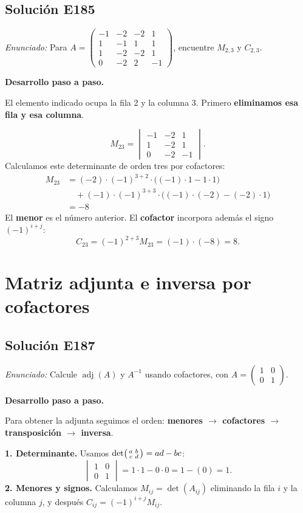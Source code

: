 \documentclass[12pt]{article}
\theoremstyle{remark}
\newcommand{\adj}{\operatorname{adj}}
\newcommand{\solucion}[2]{\Needspace{11\baselineskip}\subsection*{Solución E#1}\noindent\textit{Enunciado:} #2\par\medskip\noindent\textbf{Desarrollo paso a paso.}\par\medskip}
\begin{document}
\medskip

\solucion{185}{Para $A=\begin{pmatrix}-1&-2&-2&1\\1&-1&1&1\\1&-2&-2&1\\0&-2&2&-1\end{pmatrix}$, encuentre $M_{2,3}$ y $C_{2,3}$.}
El elemento indicado ocupa la fila 2 y la columna 3. Primero \textbf{eliminamos esa fila y esa columna}.

\[
M_{23}=\begin{vmatrix}-1&-2&1\\1&-2&1\\0&-2&-1\end{vmatrix}.
\]
Calculamos este determinante de orden tres por cofactores:
\[
\begin{aligned}M_{23}&=(-2)\cdot (-1)^{3+2}\cdot\bigl((-1)\cdot 1-1\cdot 1\bigr)\\&\quad + (-1)\cdot (-1)^{3+3}\cdot\bigl((-1)\cdot (-2)-(-2)\cdot 1\bigr)\\&=-8\end{aligned}
\]
El \textbf{menor} es el número anterior. El \textbf{cofactor} incorpora además el signo $(-1)^{i+j}$:
\[
\boxed{C_{23}=(-1)^{2+3}M_{23}=(-1)\cdot (-8)=8}.
\]

\medskip

\section{Matriz adjunta e inversa por cofactores}

\solucion{187}{Calcule $\adj(A)$ y $A^{-1}$ usando cofactores, con $A=\begin{pmatrix}1&0\\0&1\end{pmatrix}$.}
Para obtener la adjunta seguimos el orden: \textbf{menores $\to$ cofactores $\to$ transposición $\to$ inversa}.

\textbf{1. Determinante.}
Usamos $\det\begin{psmallmatrix}a&b\\c&d\end{psmallmatrix}=ad-bc$:
\[
\begin{vmatrix}1&0\\0&1\end{vmatrix}=1\cdot 1-0\cdot 0=1-(0)=1.
\]
\textbf{2. Menores y signos.} Calculamos $M_{ij}=\det(A_{ij})$ eliminando la fila $i$ y la columna $j$, y después $C_{ij}=(-1)^{i+j}M_{ij}$.
\end{document}
